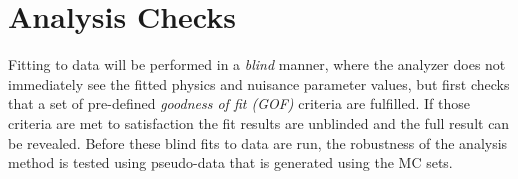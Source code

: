 






\section{Analysis Checks}

Fitting to data will be performed in a \textit{blind} manner, where the analyzer does not immediately see the fitted physics and nuisance parameter values, but first checks that a set of pre-defined \textit{goodness of fit (GOF)} criteria are fulfilled. If those criteria are met to satisfaction the fit results are unblinded and the full result can be revealed. Before these blind fits to data are run, the robustness of the analysis method is tested using pseudo-data that is generated using the MC sets.


